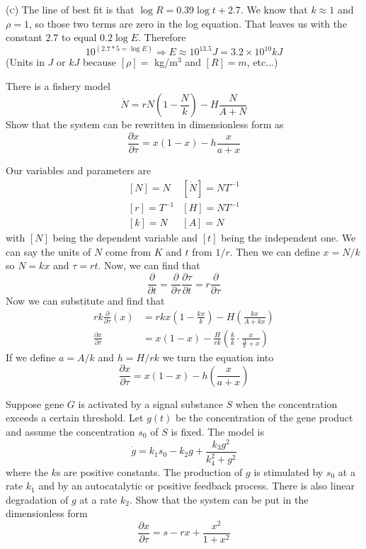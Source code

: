 \documentclass[11pt,answers]{exam}
\begin{document}
\begin{questions}
\begin{solution}
\vspace{1em}

\textsc{(c)} The line of best fit is that $\log{R} = 0.39\log{t} + 2.7$.  We know that $k \approx 1$ and $\rho = 1$, so those two terms are zero in the log equation.  That leaves us with the constant $2.7$ to equal $0.2\log{E}$.  Therefore
\[
10^{(2.7*5 = \log{E})} \Rightarrow E \approx 10^{13.5} J = 3.2 \times 10^{10} kJ
\]
(Units in $J$ or $kJ$ because $[\rho] =$ kg/m$^3$ and $[R] = m$, etc...)
\end{solution}

\item There is a fishery model
\[
\dot{N} = rN\left(1 - \frac{N}{k}\right) - H\frac{N}{A + N}
\]
Show that the system can be rewritten in dimensionless form as
\[
\frac{\partial{x}}{\partial{\tau}} = x(1-x) - h\frac{x}{a + x}
\]
\begin{solution}
Our variables and parameters are
\[
\begin{array}{l|l}
[N] = N & [\dot{N}] = NT^{-1} \\
\left[r\right] = T^{-1} & [H] = NT^{-1} \\
\left[k\right] = N & [A] = N
\end{array}
\]
with $[N]$ being the dependent variable and $[t]$ being the independent one.  We can say the units of $N$ come from $K$ and $t$ from $1/r$.  Then we can define $x = N/k$ so $N = kx$ and $\tau = rt$.  Now, we can find that 
\[
\frac{\partial}{\partial{t}} = \frac{\partial}{\partial{\tau}}\frac{\partial{\tau}}{\partial{t}} = r\frac{\partial}{\partial{\tau}}
\]
Now we can substitute and find that
\begin{align*}
rk\frac{\partial}{\partial{\tau}}(x) &= rkx(1 - \frac{kx}{k}) - H\left(\frac{kx}{A + kx}\right) \\
\frac{\partial{x}}{\partial{\tau}} &= x(1 - x) - \frac{H}{rk}\left( \frac{k}{k}\cdot\frac{x}{\frac{A}{k} + x} \right)
\end{align*}
If we define $a = A/k$ and $h = H/rk$ we turn the equation into
\[
\frac{\partial{x}}{\partial{\tau}} = x(1-x) - h\left(\frac{x}{a + x}\right)
\]
\end{solution}

\item Suppose gene $G$ is activated by a signal substance $S$ when the concentration exceeds a certain threshold.  Let $g(t)$ be the concentration of the gene product and assume the concentration $s_0$ of $S$ is fixed.  The model is
\[
\dot{g} = k_1s_0 - k_2g + \frac{k_3g^2}{k_4^2 + g^2}
\]
where the $k$s are positive constants.  The production of $g$ is stimulated by $s_0$ at a rate $k_1$ and by an autocatalytic or positive feedback process.  There is also linear degradation of $g$ at a rate $k_2$.
\newline\newline Show that the system can be put in the dimensionless form
\[
\frac{\partial{x}}{\partial{\tau}} = s - rx + \frac{x^2}{1 + x^2}
\]
\begin{solution}


\end{solution}
\end{questions}
\end{document}

